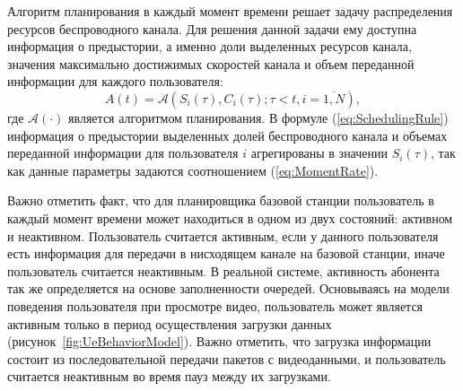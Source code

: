 Алгоритм планирования в каждый момент времени решает задачу распределения ресурсов беспроводного канала. Для решения данной задачи ему доступна информация о предыстории, а именно доли выделенных ресурсов канала, значения максимально достижимых скоростей канала и объем переданной информации для каждого пользователя:
\begin{equation}
A(t) = \mathcal{A}\left( S_i(\tau), C_i(\tau);\tau<t, i=\overline{1,N} \right),
\label{eq:SchedulingRule}
\end{equation}
где $\mathcal{A}\left(\cdot\right)$ является алгоритмом планирования. В формуле (\ref{eq:SchedulingRule}) информация о предыстории выделенных долей беспроводного канала и объемах переданной информации для пользователя $i$ агрегированы в значении $S_i(\tau)$, так как данные параметры задаются соотношением (\ref{eq:MomentRate}).

Важно отметить факт, что для планировщика базовой станции пользователь в каждый момент времени может находиться в одном из двух состояний: активном и неактивном. Пользователь считается активным, если у данного пользователя есть информация для передачи в нисходящем канале на базовой станции, иначе пользователь считается неактивным. В реальной системе, активность абонента так же определяется на основе заполненности очередей. Основываясь на модели поведения пользователя при просмотре видео, пользователь может является активным только в период осуществления загрузки данных (рисунок~\ref{fig:UeBehaviorModel}). Важно отметить, что загрузка информации состоит из последовательной передачи пакетов с видеоданными, и пользователь считается неактивным во время пауз между их загрузками.

